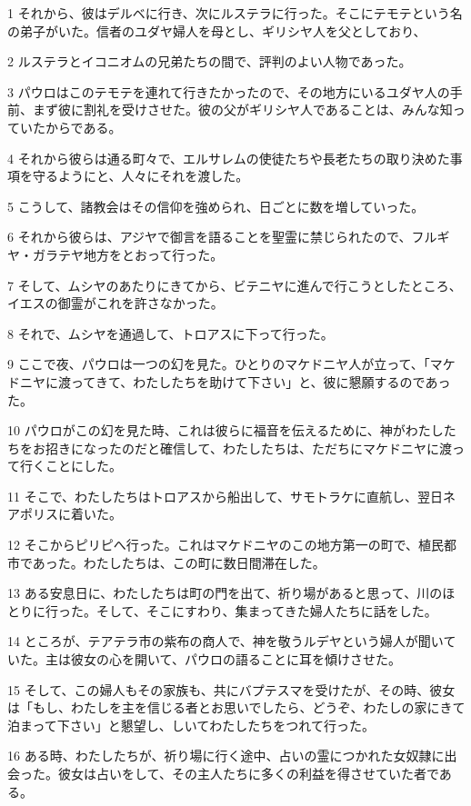 \par 1 それから、彼はデルベに行き、次にルステラに行った。そこにテモテという名の弟子がいた。信者のユダヤ婦人を母とし、ギリシヤ人を父としており、
\par 2 ルステラとイコニオムの兄弟たちの間で、評判のよい人物であった。
\par 3 パウロはこのテモテを連れて行きたかったので、その地方にいるユダヤ人の手前、まず彼に割礼を受けさせた。彼の父がギリシヤ人であることは、みんな知っていたからである。
\par 4 それから彼らは通る町々で、エルサレムの使徒たちや長老たちの取り決めた事項を守るようにと、人々にそれを渡した。
\par 5 こうして、諸教会はその信仰を強められ、日ごとに数を増していった。
\par 6 それから彼らは、アジヤで御言を語ることを聖霊に禁じられたので、フルギヤ・ガラテヤ地方をとおって行った。
\par 7 そして、ムシヤのあたりにきてから、ビテニヤに進んで行こうとしたところ、イエスの御霊がこれを許さなかった。
\par 8 それで、ムシヤを通過して、トロアスに下って行った。
\par 9 ここで夜、パウロは一つの幻を見た。ひとりのマケドニヤ人が立って、「マケドニヤに渡ってきて、わたしたちを助けて下さい」と、彼に懇願するのであった。
\par 10 パウロがこの幻を見た時、これは彼らに福音を伝えるために、神がわたしたちをお招きになったのだと確信して、わたしたちは、ただちにマケドニヤに渡って行くことにした。
\par 11 そこで、わたしたちはトロアスから船出して、サモトラケに直航し、翌日ネアポリスに着いた。
\par 12 そこからピリピへ行った。これはマケドニヤのこの地方第一の町で、植民都市であった。わたしたちは、この町に数日間滞在した。
\par 13 ある安息日に、わたしたちは町の門を出て、祈り場があると思って、川のほとりに行った。そして、そこにすわり、集まってきた婦人たちに話をした。
\par 14 ところが、テアテラ市の紫布の商人で、神を敬うルデヤという婦人が聞いていた。主は彼女の心を開いて、パウロの語ることに耳を傾けさせた。
\par 15 そして、この婦人もその家族も、共にバプテスマを受けたが、その時、彼女は「もし、わたしを主を信じる者とお思いでしたら、どうぞ、わたしの家にきて泊まって下さい」と懇望し、しいてわたしたちをつれて行った。
\par 16 ある時、わたしたちが、祈り場に行く途中、占いの霊につかれた女奴隷に出会った。彼女は占いをして、その主人たちに多くの利益を得させていた者である。
